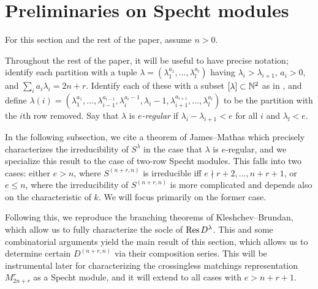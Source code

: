 \documentclass{amsart}
\begin{document}
\section{Preliminaries on Specht modules}\label{Specht Modules Section}
  For this section and the rest of the paper, assume $n > 0$.
  
  Throughout the rest of the paper, it will be useful to have precise notation;
  identify each partition with a tuple $\lambda = (\lambda_1^{a_1},\dots,\lambda_l^{a_l})$ having $\lambda_i > \lambda_{i+1}$, $a_i > 0$, and $\sum_i a_i\lambda_i = 2n + r$.
  Identify each of these with a subset $\left[ \lambda \right] \subset \mathbb{N}^2$ as in \cite{Kleshchev}, and define $\lambda(i) = (\lambda_1^{a_1},\dots,\lambda_{i-1}^{a_{i-1}},\lambda_i^{a_i - 1},\lambda_i-1,\lambda_{i+1}^{a_{i+1}},\dots,\lambda_l^{a_l})$ to be the partition with the $i$th row removed.
  Say that $\lambda$ is \emph{$e$-regular} if $\lambda_i - \lambda_{i+1} < e$ for all $i$ and $\lambda_l < e$.

  In the following subsection, we cite a theorem of James--Mathas which precisely characterizes the irreducibility of $S^\lambda$ in the case that $\lambda$ is $e$-regular, and we specialize this result to the case of two-row Specht modules.
  This falls into two cases: either $e > n$, where $S^{(n+r,n)}$ is irreducible iff $e \nmid r+2,\dots,n+r+1$, or $e \leq n$, where the irreducibility of $S^{(n+r,n)}$ is more complicated and depends also on the characteristic of $k$.
  We will focus primarily on the former case.

  Following this, we reproduce the branching theorems of Kleshchev--Brundan, which allow us to fully characterize the socle of $\operatorname{Res} D^{\lambda}$.
  This and some combinatorial arguments yield the main result of this section, which allows us to determine certain $D^{(n+r,n)}$ via their composition series.
  This will be instrumental later for characterizing the crossingless matchings representation $M_{2n + r}^r$ as a Specht module, and it will extend to all cases with $e > n + r + 1$.
\end{document}
